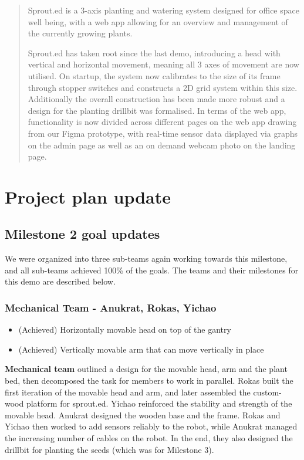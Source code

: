 \documentclass{article}
\begin{document}
 



\begin{abstract} 

Sprout.ed is a 3-axis planting and watering system designed for office space well being, with a web app allowing for an overview and management of the currently growing plants. 

Sprout.ed has taken root since the last demo, introducing a head with vertical and horizontal movement, meaning all 3 axes of movement are now utilised. On startup, the system now calibrates to the size of its frame through stopper switches and constructs a 2D grid system within this size. Additionally the overall construction has been made more robust and a design for the planting drillbit was formalised. In terms of the web app, functionality is now divided across different pages on the web app drawing from our Figma prototype, with real-time sensor data displayed via graphs on the admin page as well as an on demand webcam photo on the landing page.

\end{abstract} 

\section{Project plan update}
\subsection{Milestone 2 goal updates}
We were organized into three sub-teams again working towards this milestone, and all sub-teams achieved 100\% of the goals. The teams and their milestones for this demo are described below.
\subsubsection{\textbf{Mechanical Team - Anukrat, Rokas, Yichao}}
\vspace{3mm}
\begin{itemize}
    \vspace{-3mm}
    \setlength{\itemsep}{0pt}%
    \setlength{\parskip}{0pt}
    \item (Achieved) Horizontally movable head on top of the gantry
    \item (Achieved) Vertically movable arm that can move vertically in place
\end{itemize}
\textbf{Mechanical team} outlined a design for the movable head, arm and the plant bed, then decomposed the task for members to work in parallel. Rokas built the first iteration of the movable head and arm, and later assembled the custom-wood platform for sprout.ed. Yichao reinforced the stability and strength of the movable head. Anukrat designed the wooden base and the frame. Rokas and Yichao then worked to add sensors reliably to the robot, while Anukrat managed the increasing number of cables on the robot. In the end, they also designed the drillbit for planting the seeds (which was for Milestone 3).
\end{document}
